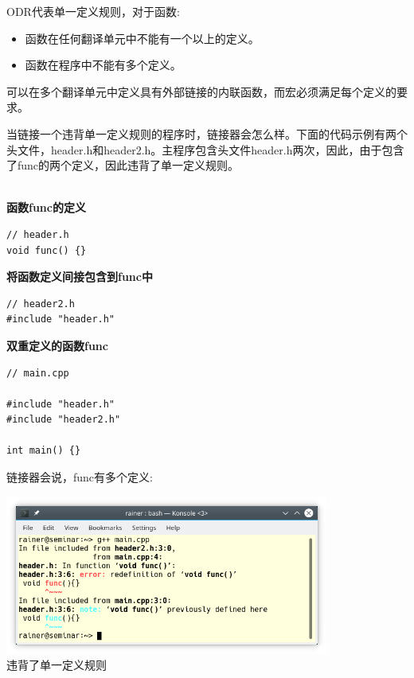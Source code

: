ODR代表单一定义规则，对于函数:

\begin{itemize}
\item 
函数在任何翻译单元中不能有一个以上的定义。

\item 
函数在程序中不能有多个定义。
\end{itemize}

可以在多个翻译单元中定义具有外部链接的内联函数，而宏必须满足每个定义的要求。

当链接一个违背单一定义规则的程序时，链接器会怎么样。下面的代码示例有两个头文件，header.h和header2.h。主程序包含头文件header.h两次，因此，由于包含了func的两个定义，因此违背了单一定义规则。

\hspace*{\fill} \\ %
\noindent
\textbf{函数func的定义}
\begin{lstlisting}[style=styleCXX]
// header.h
void func() {}
\end{lstlisting}

\noindent
\textbf{将函数定义间接包含到func中}
\begin{lstlisting}[style=styleCXX]
// header2.h
#include "header.h"
\end{lstlisting}

\noindent
\textbf{双重定义的函数func}
\begin{lstlisting}[style=styleCXX]
// main.cpp

#include "header.h"
#include "header2.h"

int main() {}
\end{lstlisting}

链接器会说，func有多个定义:

\begin{center}
\includegraphics[width=0.8\textwidth]{content/3/chapter4/images/16.png}\\
违背了单一定义规则
\end{center}

